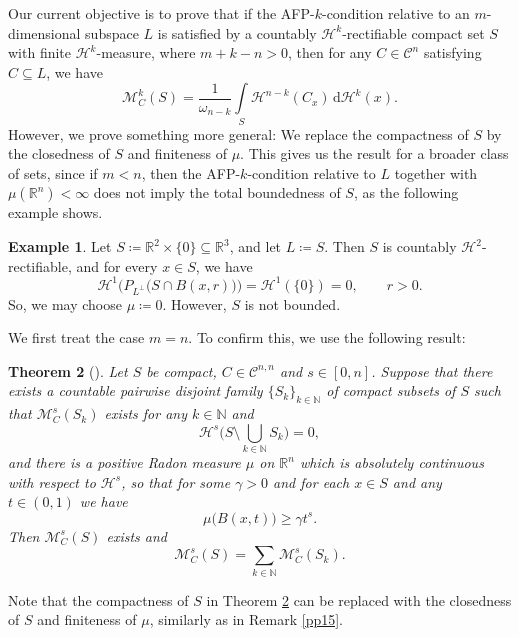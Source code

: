 \documentclass[pdflatex,sn-mathphys-num]{sn-jnl}
\theoremstyle{plain}
\newtheorem{theorem}{Theorem}[section]
\theoremstyle{definition}
\newtheorem{example}[theorem]{Example}
\newcommand{\dH}[1]{\,\mathrm d\mathcal{H}^{#1}}
\begin{document}
Our current objective is to prove that if the AFP-$k$-condition relative to an $m$-dimensional subspace $L$ is satisfied by a countably $\mathcal{H}^k$-rectifiable compact set $S$ with finite $\mathcal{H}^k$-measure, where $m+k-n>0$, then for any $C\in\mathcal{C}^n$ satisfying $C\subseteq L$, we have $$\mathcal{M}^k_{C}(S)=\frac{1}{\omega_{n-k}}
            \int\limits_{S}\mathcal{H}^{n-k}(C_x)\dH{k}(x).$$
            However, we prove something more general: We replace the compactness of $S$ by the 
            closedness of $S$ and finiteness of $\mu$. This gives us the result for a broader class of sets, since if $m<n$, then the AFP-$k$-condition relative to $L$ together with $\mu(\mathbb{R}^n)<\infty$ does not imply the total boundedness of $S$, as the following example shows.

\begin{example}
    Let $S\coloneqq\mathbb{R}^2\times\{0\}\subseteq\mathbb{R}^3$, and let $L\coloneqq S$. Then $S$ is countably $\mathcal{H}^2$-rectifiable,  and for every $x\in S$, we have $$\mathcal{H}^{1}\Big(P_{L^{\perp}}\big(S\cap B(x, r)\big)\Big)=\mathcal{H}^{1}(\{0\})=0,\qquad r>0.$$ So, we may choose $\mu\coloneqq0$. However, $S$ is not bounded.
\end{example}

We first treat the case \(m=n\). To confirm this, we use the following result:
\begin{theorem}[]\label{s}
     Let $S$ be compact, $C\in\mathcal{C}^{n, n}$ and $s\in[0, n]$. Suppose that there exists a countable pairwise disjoint family $\{S_k\}_{k\in\mathbb{N}}$ of compact subsets of $S$ such that $\mathcal{M}_C^s(S_k)$ exists for any $k\in\mathbb{N}$ and  $$\mathcal{H}^s\Big(S\setminus\bigcup_{k\in\mathbb{N}}S_k\Big)=0,$$ and there is a positive Radon measure $\mu$ on $\mathbb{R}^n$ which is absolutely continuous with respect to $\mathcal{H}^s$, so that for some $\gamma>0$ and for each $x\in S$ and any $t\in(0, 1)$ we have $$\mu\big(B(x, t)\big)\geq\gamma t^{s}. $$ Then $\mathcal{M}_C^s(S)$ exists and $$\mathcal{M}_C^s(S)=\sum_{k\in\mathbb{N}}\mathcal{M}_C^s(S_k).$$
\end{theorem}

Note that the compactness of $S$ in Theorem \ref{s} can be replaced with the closedness of $S$ and finiteness of $\mu$, similarly as in Remark \ref{pp15}. 
\end{document}
